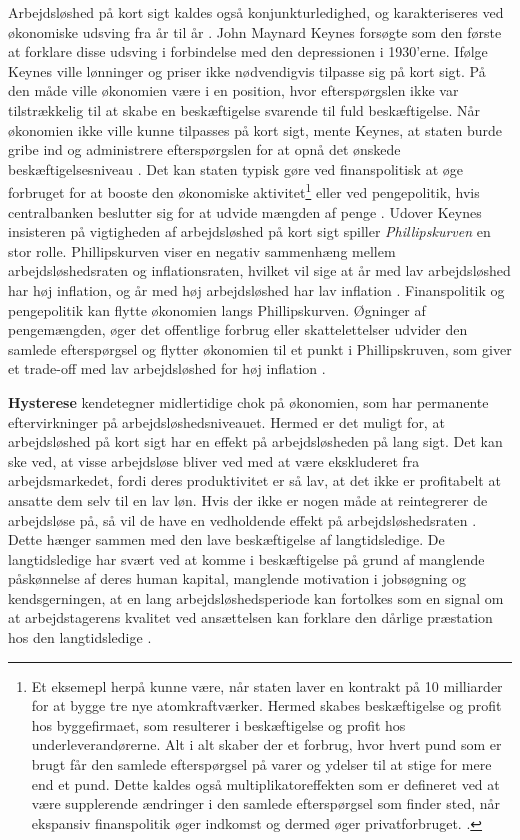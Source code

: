 Arbejdsløshed på kort sigt kaldes også konjunkturledighed, og karakteriseres ved økonomiske udsving fra år til år \parencite[592]{Mankiw2011}. John Maynard Keynes forsøgte som den første at forklare disse udsving i forbindelse med den depressionen i 1930'erne.  Ifølge Keynes ville lønninger og priser ikke nødvendigvis tilpasse sig på kort sigt. På den måde ville økonomien være i en position, hvor efterspørgslen ikke var tilstrækkelig til at skabe en beskæftigelse svarende til fuld beskæftigelse. Når økonomien ikke ville kunne tilpasses på kort sigt, mente Keynes, at staten burde gribe ind og administrere efterspørgslen for at opnå det ønskede beskæftigelsesniveau \parencite[707]{Mankiw2011}. Det kan staten typisk gøre ved finanspolitisk at øge forbruget for at booste den økonomiske aktivitet\footnote{Et eksemepl herpå kunne være, når staten laver en kontrakt på 10 milliarder for at bygge tre nye atomkraftværker. Hermed skabes beskæftigelse og profit hos byggefirmaet, som resulterer i beskæftigelse og profit hos underleverandørerne. Alt i alt skaber der et forbrug, hvor hvert pund som er brugt får den samlede efterspørgsel på varer og ydelser til at stige for mere end et pund. Dette kaldes også multiplikatoreffekten som er defineret ved at være supplerende ændringer i den samlede efterspørgsel som finder sted, når  ekspansiv finanspolitik øger indkomst og dermed øger privatforbruget. \parencite[709]{Mankiw2011}.} eller ved pengepolitik, hvis centralbanken beslutter sig for at udvide mængden af penge \parencite[718]{Mankiw2011}. Udover Keynes insisteren på vigtigheden af arbejdsløshed på kort sigt spiller \textit{Phillipskurven} en stor rolle. Phillipskurven viser en negativ sammenhæng mellem arbejdsløshedsraten og inflationsraten, hvilket vil sige at år med lav arbejdsløshed har høj inflation, og år med høj arbejdsløshed har lav inflation \parencite[783]{Mankiw2011}. Finanspolitik og pengepolitik kan flytte økonomien langs Phillipskurven. Øgninger af pengemængden, øger det offentlige forbrug eller skattelettelser udvider den samlede efterspørgsel og flytter økonomien til et punkt i Phillipskruven, som giver et trade-off med lav arbejdsløshed for høj inflation \parencite[785]{Mankiw2011}.

\textbf{Hysterese} kendetegner midlertidige chok på økonomien, som har permanente eftervirkninger på arbejdsløshedsniveauet. Hermed er det muligt for, at arbejdsløshed på kort sigt har en effekt på arbejdsløsheden på lang sigt. Det kan ske ved, at visse arbejdsløse bliver ved med at være ekskluderet fra arbejdsmarkedet, fordi deres produktivitet er så lav, at det ikke er profitabelt at ansatte dem selv til en lav løn. Hvis der ikke er nogen måde at reintegrerer de arbejdsløse på, så vil de have en vedholdende effekt på arbejdsløshedsraten \parencite[477]{Cahuc2004}. Dette hænger sammen med den lave beskæftigelse af langtidsledige. De langtidsledige har svært ved at komme i beskæftigelse på grund af manglende påskønnelse af deres human kapital, manglende motivation i jobsøgning og kendsgerningen, at en lang arbejdsløshedsperiode kan fortolkes som en signal om at arbejdstagerens kvalitet ved ansættelsen kan forklare den dårlige præstation hos den langtidsledige \parencite[479]{Cahuc2004}.


